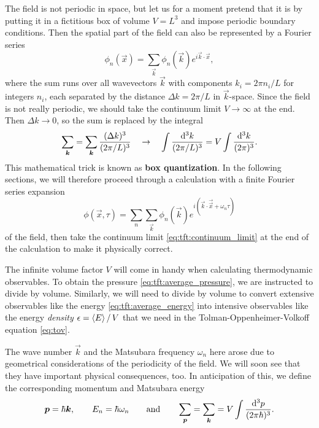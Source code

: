 The field is not periodic in space, but let us for a moment pretend that it is by putting it in a fictitious box of volume $V = L^3$ and impose periodic boundary conditions.
Then the spatial part of the field can also be represented by a Fourier series
\begin{equation}
	\phi_n(\vec{x}) = \sum_\vec{k} \phi_n(\vec{k}) e^{i \vec{k} \cdot \vec{x}} ,
\end{equation}
where the sum runs over all wavevectors $\vec{k}$ with components $k_i = 2 \pi n_i / L$ for integers $n_i$, each separated by the distance $\Delta k = 2 \pi / L$ in $\vec{k}$-space.
Since the field is not really periodic, we should take the continuum limit $V \rightarrow \infty$ at the end.
Then $\Delta k \rightarrow 0$, so the sum is replaced by the integral
\begin{equation}
	\sum_{\bm{k}} = 
	\sum_{\bm{k}} \frac{(\Delta k)^3}{(2 \pi / L)^3} 
	\quad \rightarrow  \quad
	\int \frac{\mathop{}\!\mathrm{d}^3 k}{(2 \pi / L)^3} =
	V \int \frac{\mathop{}\!\mathrm{d}^3 k}{(2 \pi)^3} .
\label{eq:tft:continuum_limit}
\end{equation}
This mathematical trick is known as \textbf{box quantization}.
In the following sections, we will therefore proceed through a calculation with a finite Fourier series expansion
\begin{equation}
	\phi(\vec{x}, \tau) = \sum_n \sum_\vec{k} \phi_n(\vec{k}) e^{i (\vec{k} \cdot \vec{\vec{x}} + \omega_n \tau)}
\label{eq:tft:fourier_series}
\end{equation}
of the field, then take the continuum limit \eqref{eq:tft:continuum_limit} at the end of the calculation to make it physically correct.

The infinite volume factor $V$ will come in handy when calculating thermodynamic observables.
To obtain the pressure \eqref{eq:tft:average_pressure}, we are instructed to divide by volume.
Similarly, we will need to divide by volume to convert extensive observables like the energy \eqref{eq:tft:average_energy} into intensive observables like the energy \emph{density} $\epsilon = \left\langle E \right\rangle / \, V$ that we need in the Tolman-Oppenheimer-Volkoff equation \eqref{eq:tov}.

The wave number $\vec{k}$ and the Matsubara frequency $\omega_n$ here arose due to geometrical considerations of the periodicity of the field.
We will soon see that they have important physical consequences, too.
In anticipation of this, we define the corresponding momentum and Matsubara energy
\begin{equation}
	{\bm{p}} = \hbar {\bm{k}}, \qquad
	E_n = \hbar \omega_n \qquad \text{and} \qquad
	\sum_{\bm{p}} = \sum_{\bm{k}} = V \int \frac{\mathop{}\!\mathrm{d}^3 p}{(2 \pi \hbar)^3}.
\label{eq:tft:matsubara_energies}
\end{equation}

